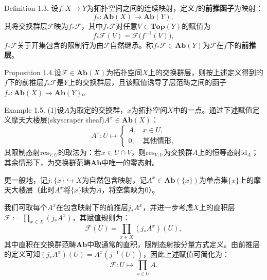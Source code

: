 \documentclass{beamer}
\begin{document}
\begin{frame}


\begin{block}{Definition 1.3.}
 设$f:X\to Y$为拓扑空间之间的连续映射，定义$f$的\textbf{前推函子}为映射：
\[
f_{*}: \mathbf{Ab}(X) \to \mathbf{Ab}(Y),
\]
其将交换群层$\mathcal{F}$映为$f_{*}\mathcal{F}$，其中$f_{*}\mathcal{F}$对任意$V\in\mathbf{Top}(Y)$的赋值为
\[
f_{*}\mathcal{F}(V) = \mathcal{F}\bigl(f^{-1}(V)\bigr),
\]
$f_{*}\mathcal{F}$关于开集包含的限制行为由$\mathcal{F}$自然继承。称$f_{*}\mathcal{F}\in\mathbf{Ab}(Y)$为$\mathcal{F}$在$f$下的\textbf{前推层}。
\end{block}

\end{frame}

\begin{frame}
\begin{block}{Proposition 1.4.}设$\mathcal{F}\in\mathbf{Ab}(X)$为拓扑空间$X$上的交换群层，则按上述定义得到的$f$下的前推层$f_{*}\mathcal{F}$是$Y$上的交换群层，且该赋值诱导了层范畴之间的函子$f_{*}: \mathbf{Ab}(X) \to \mathbf{Ab}(Y)$。

\end{block}
\end{frame}


\begin{frame}
\begin{block}{Example 1.5.}
(1)设$A$为取定的交换群，$x$为拓扑空间$X$中的一点。通过下述赋值定义摩天大楼层(skyscraper sheaf)$A^x \in \mathbf{Ab}(X)$：
\[
A^x: U \mapsto
\begin{cases}
A, & x \in U, \\
0, & \text{其他情形},
\end{cases}
\]
其限制态射$\mathrm{res}_{V,U}$的取法为：若$x \in U \cap V$，则$\mathrm{res}_{V,U}$为交换群$A$上的恒等态射$\mathrm{id}_A$；其余情形下，为交换群范畴$\mathbf{Ab}$中唯一的零态射。

更一般地，记$j: \{x\} \hookrightarrow X$为自然包含映射，记$A^x \in \mathbf{Ab}(\{x\})$为单点集$\{x\}$上的摩天大楼层（此时$A^x$将$\{x\}$映为$A$，将空集映为$0$）。

\end{block}
\end{frame}
\begin{frame}
我们可取每个$A^x$在包含映射下的前推层$j_*A^x$，并进一步考虑$X$上的直积层$\mathcal{F}:=\prod_{x\in X}(j_*A^x)$，其赋值规则为：
\[
\mathcal{F}(U) = \prod_{x\in X} (j_*A^x)(U),
\]
其中直积在交换群范畴$\mathbf{Ab}$中取通常的直积，限制态射按分量方式定义。由前推层的定义可知$(j_*A^x)(U)=A^x(j^{-1}(U))$，因此上述赋值可简化为：
\[
\mathcal{F}: U \mapsto \prod_{x\in U} A.
\]

\end{frame}
\end{document}
